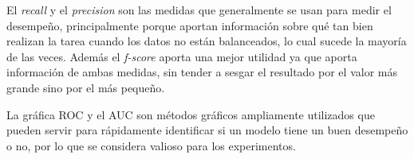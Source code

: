 \par El \textit{recall} y el \textit{precision} son las medidas que generalmente se usan para medir el desempeño, principalmente porque aportan información sobre qué tan bien realizan la tarea cuando los datos no están balanceados, lo cual sucede la mayoría de las veces. Además el \textit{f-score} aporta una mejor utilidad ya que aporta información de ambas medidas, sin tender a sesgar el resultado por el valor más grande sino por el más pequeño.

\par La gráfica ROC y el AUC son métodos gráficos ampliamente utilizados que pueden servir para rápidamente identificar si un modelo tiene un buen desempeño o no, por lo que se considera valioso para los experimentos.


